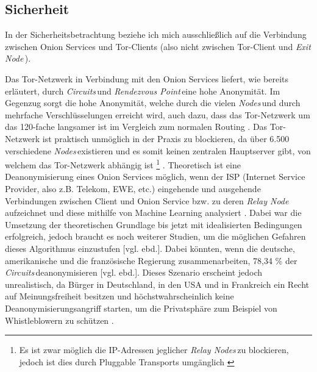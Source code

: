 \documentclass[a4paper,ngerman, headheight=28pt,12pt]{scrartcl}
\newcommand{\vcite}[1]{\cite[vgl.][]{#1}}
\newcommand{\vebd}{[vgl. ebd.]}
\newcommand{\relayn}{\textit{Relay Node\,}}
\newcommand{\relayns}{\textit{Relay Nodes\,}}
\newcommand{\exitn}{\textit{Exit Node\,}}
\newcommand{\nodes}{\textit{Nodes\,}}
\newcommand{\circuits}{\textit{Circuits\,}}
\newcommand{\renp}{\textit{Rendezvous Point\,}}
\begin{document}
\subsection{Sicherheit}
In der Sicherheitsbetrachtung beziehe ich mich ausschließlich auf die Verbindung zwischen Onion Services und Tor-Clients (also nicht zwischen Tor-Client und \exitn).

Das Tor-Netzwerk in Verbindung mit den Onion Services liefert, wie bereits erläutert, durch \circuits und \renp eine hohe Anonymität. Im Gegenzug sorgt die hohe Anonymität, welche durch die vielen \nodes und durch mehrfache Verschlüsselungen erreicht wird, auch dazu, dass das Tor-Netzwerk um das 120-fache langsamer ist im Vergleich zum normalen Routing \vcite{TorPerformance}.
Das Tor-Netzwerk ist praktisch unmöglich in der Praxis zu blockieren, da über 6.500 verschiedene \nodes existieren und es somit keinen zentralen Hauptserver gibt, von welchem das Tor-Netzwerk abhängig ist \footnote{Es ist zwar möglich die IP-Adressen jeglicher \relayns zu blockieren, jedoch ist dies durch Pluggable Transports umgänglich \vcite{PluggableTransports}} \vcite{DeanonymizingTorBook}.
Theoretisch ist eine Deanonymisierung eines Onion Services möglich, wenn der ISP (Internet Service Provider, also z.B. Telekom, EWE, etc.) eingehende und ausgehende Verbindungen zwischen Client und Onion Service bzw. zu deren \relayn aufzeichnet und diese mithilfe von Machine Learning analysiert \vcite{OnionServiceFingerprinting}. Dabei war die Umsetzung der theoretischen Grundlage bis jetzt mit idealisierten Bedingungen erfolgreich, jedoch braucht es noch weiterer Studien, um die möglichen Gefahren dieses Algorithmus einzustufen \vebd. Dabei könnten, wenn die deutsche, amerikanische und die französische Regierung zusammenarbeiten, 78,34 \% der \circuits deanonymisieren \vebd.
Dieses Szenario erscheint jedoch unrealistisch, da Bürger in Deutschland, in den USA und in Frankreich ein Recht auf Meinungsfreiheit besitzen und höchstwahrscheinlich keine Deanonymisierungsangriff starten, um die Privatsphäre zum Beispiel von Whistleblowern zu schützen  \vcite{AmnReport,ROG-USA}.
\end{document}
